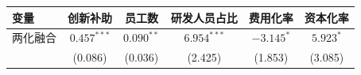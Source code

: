 {\scriptsize
\begin{center}
\begin{tabular}{lccccc}
  \toprule
  变量 & 创新补助 & 员工数 & 研发人员占比 & 费用化率 & 资本化率 \\
  \midrule
  两化融合 & $0.457^{***}$ & $0.090^{**}$ & $6.954^{***}$ & $-3.145^{*}$ & $5.923^{*}$ \\
           & (0.086) & (0.036) & (2.425) & (1.853) & (3.085) \\
  \bottomrule
\end{tabular}
\end{center}
}
